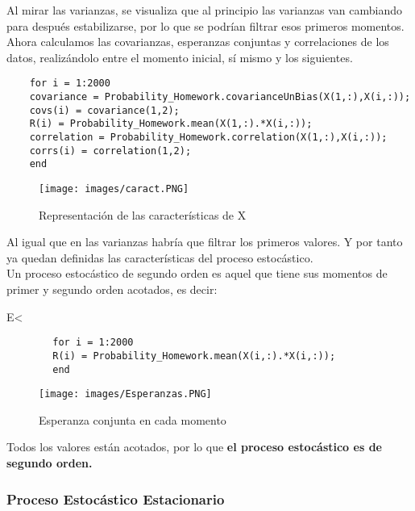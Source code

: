 \documentclass[a4paper, fontsize=11pt]{scrartcl} %
\numberwithin{equation}{section} %
\numberwithin{figure}{section} %
\numberwithin{table}{section} %
\newenvironment{myalign}{\par\nobreak\large\noindent\align}{\endalign} %
\begin{document}
	Al mirar las varianzas, se visualiza que al principio las varianzas van cambiando para después estabilizarse, por lo que se podrían filtrar esos primeros momentos. Ahora calculamos las covarianzas, esperanzas conjuntas y correlaciones de los datos, realizándolo entre el momento inicial, sí mismo y los siguientes.
	
	\begin{lstlisting}
	for i = 1:2000
	covariance = Probability_Homework.covarianceUnBias(X(1,:),X(i,:));
	covs(i) = covariance(1,2);
	R(i) = Probability_Homework.mean(X(1,:).*X(i,:));
	correlation = Probability_Homework.correlation(X(1,:),X(i,:));
	corrs(i) = correlation(1,2);
	end
	\end{lstlisting}
	
	\begin{figure}[h!]
		\centering
		\texttt{[image: images/caract.PNG]}
		\caption{Representación de las características de X}
		\label{Caracteristicas2}
	\end{figure}
	\FloatBarrier
	
	Al igual que en las varianzas habría que filtrar los primeros valores. Y por tanto ya quedan definidas las características del proceso estocástico.\\
	
	Un proceso estocástico de segundo orden es aquel que tiene sus momentos de primer y segundo orden acotados, es decir:
	
	\begin{myalign}
		E\left[ x^2(k) \right] < \infty
	\end{myalign}
	
	\begin{lstlisting}
		for i = 1:2000
		R(i) = Probability_Homework.mean(X(i,:).*X(i,:));
		end
	\end{lstlisting}
	
	\begin{figure}[h!]
		\centering
		\texttt{[image: images/Esperanzas.PNG]}
		\caption{Esperanza conjunta en cada momento}
		\label{Esperanzas}
	\end{figure}
	\FloatBarrier
	
	Todos los valores están acotados, por lo que \textbf{el proceso estocástico es de segundo orden.}\\
	
	\subsubsection{Proceso Estocástico Estacionario}
	
\end{document}
